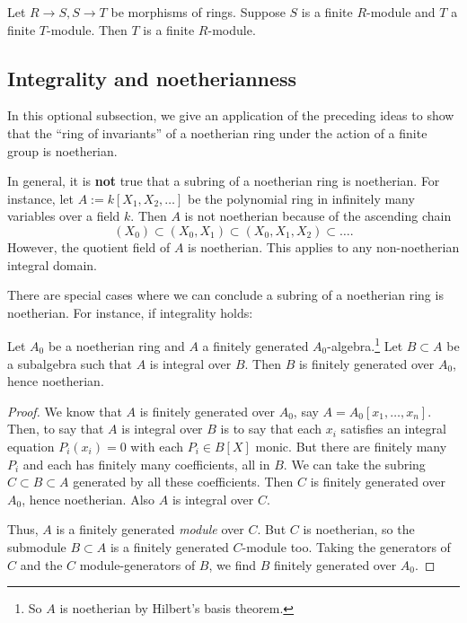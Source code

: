 \begin{exercise}
Let $R \to S, S \to T$ be morphisms of rings. Suppose $S$ is a finite
$R$-module and $T$ a finite $T$-module. Then $T$ is a finite $R$-module.
\end{exercise}

\subsection{Integrality and noetherianness}

In this optional subsection, we give an application of the preceding ideas to
show that the ``ring of invariants'' of a noetherian ring under the action of a
finite group is noetherian.

In general, it is \textbf{not} true  that a subring of a noetherian ring
is noetherian.  For instance, let $A := k[X_1, X_2, \dots]$ be the polynomial
ring in infinitely many variables over a field $k$.  Then $A$ is not noetherian
because of the ascending chain
\[ (X_0) \subset (X_0, X_1) \subset (X_0, X_1, X_2) \subset \dots.\]
However, the quotient field of $A$ is noetherian.  This applies to any
non-noetherian integral domain.

There are special cases where we can conclude a subring of a noetherian ring
is noetherian.
For instance, if integrality holds:

\begin{theorem} Let $A_0$ be  a noetherian ring and $A$ a finitely generated
$A_0$-algebra.\footnote{So $A$ is noetherian by Hilbert's basis theorem.}  Let $B \subset A$ be a subalgebra such that $A$ is integral
over $B$.  Then $B$ is finitely generated over $A_0$, hence noetherian.
\end{theorem}

\begin{proof}
We know that $A$ is finitely generated over $A_0$, say $A=A_0[x_1, \dots, x_n]$.  Then,
 to say that $A$ is integral over $B$ is to say that each
$x_i$ satisfies an integral equation $P_i(x_i)=0$ with each $P_i \in B[X]$ monic.
But there are finitely many $P_i$ and each has finitely many coefficients,
all in $B$.  We can take the subring $C \subset B \subset A$ generated
by all these coefficients.  Then $C$ is finitely generated over $A_0$,
hence noetherian.  Also $A$ is integral over $C$.
  
 Thus, $A$ is a finitely generated \emph{module} over $C$.
 But $C$
is noetherian, so the submodule $B \subset A$ is a finitely generated $C$-module too.
Taking the generators of $C$ and the $C$ module-generators of $B$, we find
$B$ finitely generated over $A_0$.
\end{proof}



